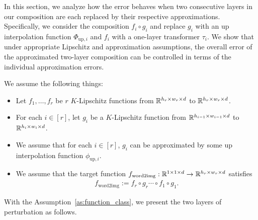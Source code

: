 In this section, we analyze how the error behaves when two consecutive layers in our composition are each replaced by their respective approximations. Specifically, we consider the composition $f_i \circ g_i$ and replace $g_i$ with an up interpolation function $\Phi_{\mathrm{up},i}$ and $f_i$ with a one-layer transformer $\tau_i$. We show that under appropriate Lipschitz and approximation assumptions, the overall error of the approximated two-layer composition can be controlled in terms of the individual approximation errors.

\begin{assumption}\label{as:function_class}
    We assume the following things:
    \begin{itemize}
        \item Let $f_1, \ldots, f_r$ be $r$ $K$-Lipschitz functions from $\mathbb{R}^{h_r \times w_r \times d}$ to $\mathbb{R}^{h_r \times w_r \times d}$.
        \item For each $i \in [r]$, let $g_i$ be a $K$-Lipschitz function from $\mathbb{R}^{h_{i-1} \times w_{i-1} \times d}$ to $\mathbb{R}^{h_i \times w_i \times d}$.
        \item We assume that for each $i \in [r]$, $g_i$ can be approximated by some up interpolation function $\phi_{\mathrm{up},i}$.
        \item We assume that the target function $f_{\mathrm{word2img}}:\mathbb{R}^{1 \times 1 \times d} \to \mathbb{R}^{h_r \times w_r \times d}$ satisfies
    \begin{align*}
        f_{\mathrm{word2img}} := f_r \circ g_r \cdots \circ f_1 \circ g_1.
    \end{align*}
    \end{itemize}
\end{assumption}

With the Assumption~\ref{as:function_class}, we present the two layers of perturbation as follows. 

